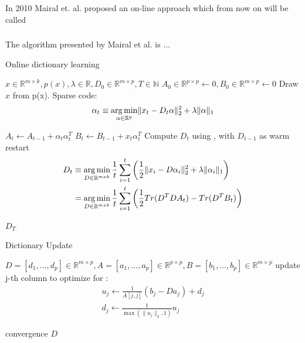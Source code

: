 
In 2010 Mairal et. al.\cite{Mairal2010} proposed an on-line approach which from
now on will be called \trainDL

\subsubsection{\trainDL}
\label{sec:mairal}
The algorithm presented by Mairal et al.\cite{Mairal2010} is ...

\begin{algorithm}[H]
\caption{Online dictionary learning\cite{Mairal2010}}
\label{alg:trainDL}
\begin{algorithmic}[1]
\REQUIRE $x \in \mathbb{R}^{m \times k},  p \left( x \right), \lambda \in \mathbb{R}, D_0 \in \mathbb{R}^{m \times p}, T \in \mathbb{N}$
\STATE $A_0 \in \mathbb{R}^{p \times p} \gets  0, B_0 \in \mathbb{R}^{m \times p}\gets 0$
\STATE Draw $x$ from p(x).
\STATE Sparse code:
\begin{align*} 
\alpha_t \equiv \operatorname*{arg\,min}_{\alpha\in\mathbb{R}^{p}}  \lVert x_t - D_t\alpha \rVert^{2}_{2}  +  \lambda \lVert \alpha \rVert_{1}
\end{align*}

\STATE $A_t \gets A_{t-1} + \alpha_t\alpha_t^T$
\STATE $B_t \gets B_{t-1} + x_t\alpha_t^T$
\STATE Compute $D_t$ using , with $D_{t-1}$ as warm restart 
\begin{equation}
\begin{split}
D_t  & \equiv \operatorname*{arg\,min}_{D \in \mathbb{R}^{m x k}}  \frac{1}{t} \sum_{i=1}^t
\left( \frac{1}{2} \lVert x_i - D\alpha_i \rVert^{2}_{2}  +  \lambda \lVert
\alpha_i \rVert_{1} \right) \\
& = \operatorname*{arg\,min}_{D \in \mathbb{R}^{m x k}}  \frac{1}{t} \sum_{i=1}^t
\left( \frac{1}{2} Tr(D^TDA_t) - Tr(D^TB_t)\right) \label{eq:update}
\end{split}
\end{equation}
 
\ENDFOR
\RETURN $D_T$
\end{algorithmic}
\end{algorithm}


\begin{algorithm}[H]
\caption{Dictionary Update}
\label{alg:update}
\begin{algorithmic}[1]
\REQUIRE $D=[d_1,...,d_p] \in \mathbb{R}^{m \times p}, A=[a_1,...,a_p] \in \mathbb{R}^{p \times p}, B=[b_1,...,b_p] \in \mathbb{R}^{m \times p}$
\REPEAT
{}
\STATE update j-th column to optimize for :
\begin{align*}
u_j \gets \frac{1}{A[j,j]}\left(b_j-Da_j\right)+d_j \\
d_j \gets \frac{1}{\max\left(\lVert u_j \rVert_2,1\right)} u_j
\end{align*}

\ENDFOR
\UNTIL convergence 
\RETURN $D$
\end{algorithmic}
\end{algorithm}

